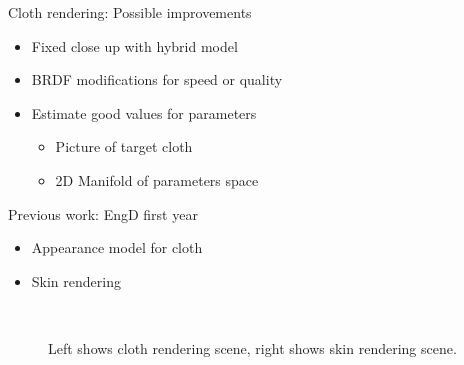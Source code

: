 \documentclass{beamer}
\begin{document}
\begin{frame}{Cloth rendering: Possible improvements}
\begin{itemize}
\setlength\itemsep{0.5em}
\item Fixed close up with hybrid model
\item BRDF modifications for speed or quality
\item Estimate good values for parameters
	\begin{itemize}
	\item Picture of target cloth
	\item 2D Manifold of parameters space 
	\end{itemize}		
\end{itemize}
\end{frame}

\begin{frame}{Previous work: EngD first year}
\begin{multicols}{2}
\begin{itemize}
\setlength\itemsep{0.5em}
\item Appearance model for cloth
\item Skin rendering
\end{itemize}
\end{multicols}
\begin{center}
\begin{figure}
~
\caption*{\tiny{Left shows cloth rendering scene, right shows skin rendering scene.}}
\end{figure}
\end{center}
\end{frame}
\end{document}
